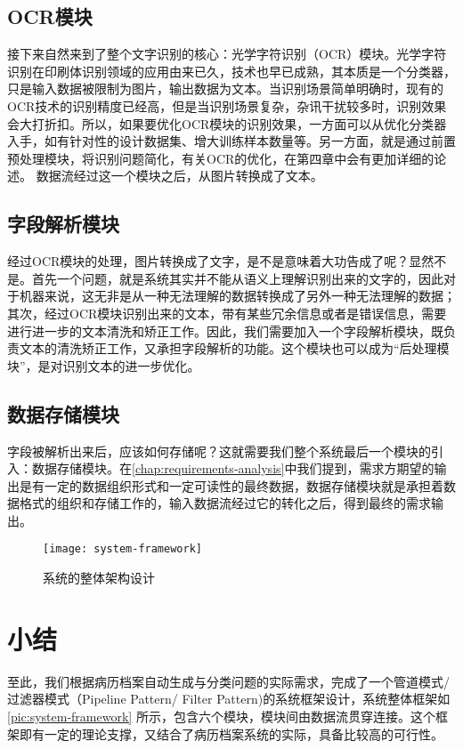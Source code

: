 \subsection{OCR模块}
接下来自然来到了整个文字识别的核心：光学字符识别（OCR）模块。光学字符识别在印刷体识别领域的应用由来已久\citep{impedovo1991optical}，技术也早已成熟，其本质是一个分类器，只是输入数据被限制为图片，输出数据为文本。当识别场景简单明确时，现有的OCR技术的识别精度已经高，但是当识别场景复杂，杂讯干扰较多时，识别效果会大打折扣。所以，如果要优化OCR模块的识别效果，一方面可以从优化分类器入手，如有针对性的设计数据集、增大训练样本数量等。另一方面，就是通过前置预处理模块，将识别问题简化，有关OCR的优化，在第四章中会有更加详细的论述。
数据流经过这一个模块之后，从图片转换成了文本。

\subsection{字段解析模块}
经过OCR模块的处理，图片转换成了文字，是不是意味着大功告成了呢？显然不是。首先一个问题，就是系统其实并不能从语义上理解识别出来的文字的，因此对于机器来说，这无非是从一种无法理解的数据转换成了另外一种无法理解的数据；其次，经过OCR模块识别出来的文本，带有某些冗余信息或者是错误信息，需要进行进一步的文本清洗和矫正工作。因此，我们需要加入一个字段解析模块，既负责文本的清洗矫正工作，又承担字段解析的功能。这个模块也可以成为“后处理模块”，是对识别文本的进一步优化。

\subsection{数据存储模块}
字段被解析出来后，应该如何存储呢？这就需要我们整个系统最后一个模块的引入：数据存储模块。在\autoref{chap:requirements-analysis}中我们提到，需求方期望的输出是有一定的数据组织形式和一定可读性的最终数据，数据存储模块就是承担着数据格式的组织和存储工作的，输入数据流经过它的转化之后，得到最终的需求输出。
\begin{figure}[htbp]
	\centering
	\texttt{[image: system-framework]}
	\caption{系统的整体架构设计}
	\label{pic:system-framework}
\end{figure}

\section{小结}
至此，我们根据病历档案自动生成与分类问题的实际需求，完成了一个管道模式/过滤器模式（Pipeline Pattern/ Filter Pattern)的系统框架设计，系统整体框架如\autoref{pic:system-framework}
所示，包含六个模块，模块间由数据流贯穿连接。这个框架即有一定的理论支撑，又结合了病历档案系统的实际，具备比较高的可行性。
